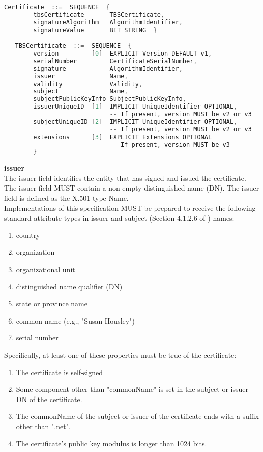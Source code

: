 \begin{lstlisting}[language=c, caption={X.509 v3 Certificate structure}]
Certificate  ::=  SEQUENCE  {
        tbsCertificate       TBSCertificate,
        signatureAlgorithm   AlgorithmIdentifier,
        signatureValue       BIT STRING  }

   TBSCertificate  ::=  SEQUENCE  {
        version         [0]  EXPLICIT Version DEFAULT v1,
        serialNumber         CertificateSerialNumber,
        signature            AlgorithmIdentifier,
        issuer               Name,
        validity             Validity,
        subject              Name,
        subjectPublicKeyInfo SubjectPublicKeyInfo,
        issuerUniqueID  [1]  IMPLICIT UniqueIdentifier OPTIONAL,
                             -- If present, version MUST be v2 or v3
        subjectUniqueID [2]  IMPLICIT UniqueIdentifier OPTIONAL,
                             -- If present, version MUST be v2 or v3
        extensions      [3]  EXPLICIT Extensions OPTIONAL
                             -- If present, version MUST be v3
        }
\end{lstlisting}

\textbf{issuer}
\\
The issuer field identifies the entity that has signed and issued the certificate.  The issuer field MUST contain a non-empty distinguished name (DN).  The issuer field is defined as the X.501 type Name.
\\

Implementations of this specification MUST be prepared to receive the following standard attribute types in issuer and subject (Section 4.1.2.6 of \cite{crl_rfc} ) names:
\begin{enumerate}
	\item country
	\item organization
	\item organizational unit
	\item distinguished name qualifier (DN)
	\item state or province name
	\item common name (e.g., "Susan Housley")
	\item serial number
\end{enumerate}

Specifically, at least one of these properties must be true of the certificate:\label{inpro:criteria}
\begin{enumerate}
	\item The certificate is self-signed
	\item Some component other than "commonName" is set in the subject or issuer DN of the certificate.
	\item The commonName of the subject or issuer of the certificate ends with a suffix other than ".net".
	\item The certificate's public key modulus is longer than 1024 bits.
\end{enumerate}
  
